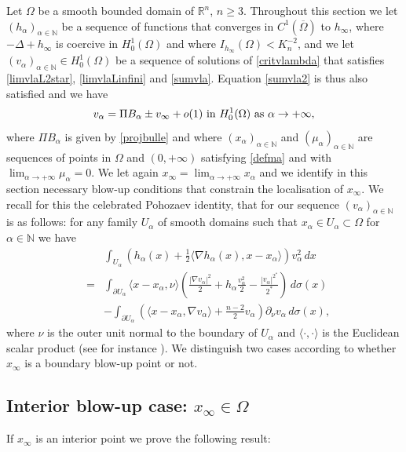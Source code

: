 \documentclass[10pt]{amsart}
\numberwithin{equation}{section}
\newcommand{\Om}{\Omega}
\newcommand{\ma}{\mu_\alpha}
\def \rr {\mathbb{R}}
\def \bb{\hbox}
\def \xl{x_\alpha}
\def \ma{\mu_{\alpha}}
\def \va{v_{\alpha}}
\def \ha{h_{\alpha}}
\def \hi{h_{\infty}}
\def \vo {v_{\infty}}
\def \nn{\mathbb{N}}
\def \r {\rangle}
\def \l{\langle}
\theoremstyle{plain}
\theoremstyle{remark}
\begin{document}
		
Let $\Om$ be a smooth bounded domain of $\rr^n$, $n\geq 3$. Throughout this section we let $(\ha)_{\alpha\in\nn}$ be a sequence of functions that converges in $C^{1}(\overline{\Om})$ to $\hi$, where $-\Delta+\hi$ is coercive in $H^1_0(\Om)$ and where $I_{\hi}(\Om)<K_{n}^{-2}$, and we let $(\va)_{\alpha\in\nn}\in H_0^1(\Om)$ be a sequence of solutions of \eqref{critvlambda} that satisfies \eqref{limvlaL2star}, \eqref{limvlaLinfini} and \eqref{sumvla}. Equation \eqref{sumvla2} is thus also satisfied and 
we have 
 \begin{equation*} 
 	\va=\Pi B_{\alpha}\pm\vo+o(1)  \bb{ in } H_0^1(\Om) \text{ as } \alpha \to + \infty,  
\end{equation*}
where $\Pi B_\alpha$ is given by \eqref{projbulle} and where $(x_\alpha)_{\alpha \in \nn}$ and $(\ma)_{\alpha \in \nn}$ are sequences of points in $\Om$ and $(0, + \infty)$ satisfying \eqref{defma} and with $\lim_{\alpha \to + \infty} \ma = 0$. We let again $x_\infty = \lim_{\alpha \to + \infty} x_\alpha$ and we identify in this section necessary blow-up conditions that constrain the localisation of $x_\infty$. We recall for this the celebrated Pohozaev identity, that for our sequence $(\va)_{\alpha\in\nn}$ is as follows: for any family $U_{\alpha}$ of smooth domains such that $\xl\in U_{\alpha}\subset \Om$ for $\alpha\in\nn$ we have 
 \begin{eqnarray}\label{poa}
	&&\int_{U_{\alpha}}\left(\ha(x)+\frac12 \l\nabla \ha(x),x-\xl\r \right)  \va^2\, dx\nonumber\\
		&=&\int_{\partial U_{\alpha}} \l x-\xl, \nu \r\left(  \frac{|\nabla \va|^2}{2}+\ha \frac{\va^2}{2}
		-\frac{|\va|^{2^*}}{2^*}\right) \,  d\sigma(x)\\
		&&-\int_{\partial U_{\alpha}}\left( \l x-\xl, \nabla \va \r +\frac{n-2}{2}\va\right)\partial_{\nu}\va \,  d\sigma(x),\nonumber
	\end{eqnarray}
where $\nu$ is the outer unit normal to the boundary of $U_\alpha$ and $\l \cdot, \cdot \r$ is the Euclidean scalar product (see for instance \cite[Lemma 6.5]{HebeyZLAM}). We distinguish two cases according to whether $x_\infty$ is a boundary blow-up point or not.


\subsection{Interior blow-up case: $x_\infty \in \Om$} If $x_\infty$ is an interior point we prove the following result:
\end{document}
